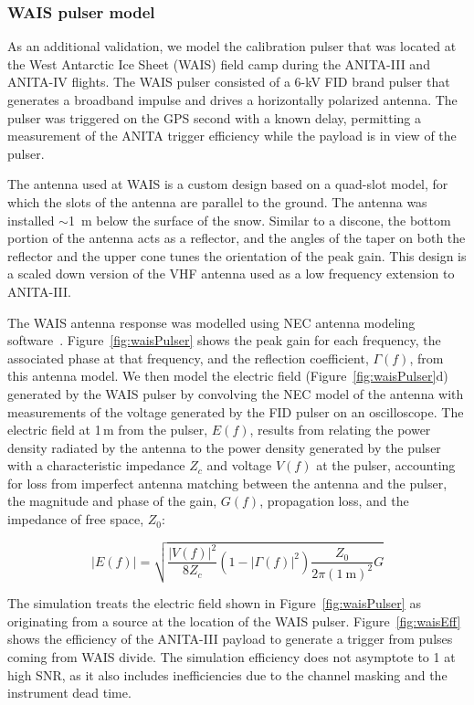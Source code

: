 \subsubsection{WAIS pulser model}
\label{subsec:wais}

As an additional validation, we model the calibration pulser that was located at the West Antarctic Ice Sheet (WAIS) field camp during the ANITA-III and ANITA-IV flights. The WAIS pulser consisted of a 6-kV FID brand pulser that generates a broadband impulse and drives a horizontally polarized antenna. The pulser was triggered on the GPS second with a known delay, permitting a measurement of the  ANITA trigger efficiency while the payload is in view of the pulser.

The antenna used at WAIS is a custom design based on a quad-slot model, for which the slots of the antenna are parallel to the ground. The antenna was installed $\sim$1~m below the surface of the snow. Similar to a discone, the bottom portion of the antenna acts as a reflector, and the angles of the taper on both the reflector and the upper cone tunes the orientation of the peak gain. This design is a scaled down version of the VHF antenna used as a low frequency extension to ANITA-III. 

The WAIS antenna response was modelled using NEC antenna modeling software~\cite{nec}. Figure~\ref{fig:waisPulser} shows the peak gain for each frequency, the associated phase at that frequency, and the reflection coefficient, $\Gamma(f)$, from this antenna model. We then model the electric field (Figure~\ref{fig:waisPulser}d) generated by the WAIS pulser by convolving the NEC model of the antenna with measurements of the voltage generated by the FID pulser on an oscilloscope. The electric field at 1\,m from the pulser, $E(f)$, results from relating the power density radiated by the antenna to the power density generated by the pulser with a characteristic impedance $Z_{c}$ and voltage $V(f)$ at the pulser, accounting for loss from imperfect antenna matching between the antenna and the pulser, the magnitude and phase of the gain, $G(f)$, propagation loss, and the impedance of free space, $Z_0$:

\begin{equation}
|E(f)| = \sqrt{\frac{|V(f)|^2}{8 Z_c} (1 -|\Gamma(f)|^2 ) \frac{Z_0}{2\pi (1~\textrm{m})^2} G}
\end{equation}

The simulation treats the electric field shown in Figure~\ref{fig:waisPulser} as originating from a source at the location of the WAIS pulser. Figure~\ref{fig:waisEff} shows the efficiency of the ANITA-III payload to generate a trigger from pulses coming from WAIS divide. The simulation efficiency does not asymptote to 1 at high SNR, as it also includes inefficiencies due to the channel masking and the instrument dead time. 

